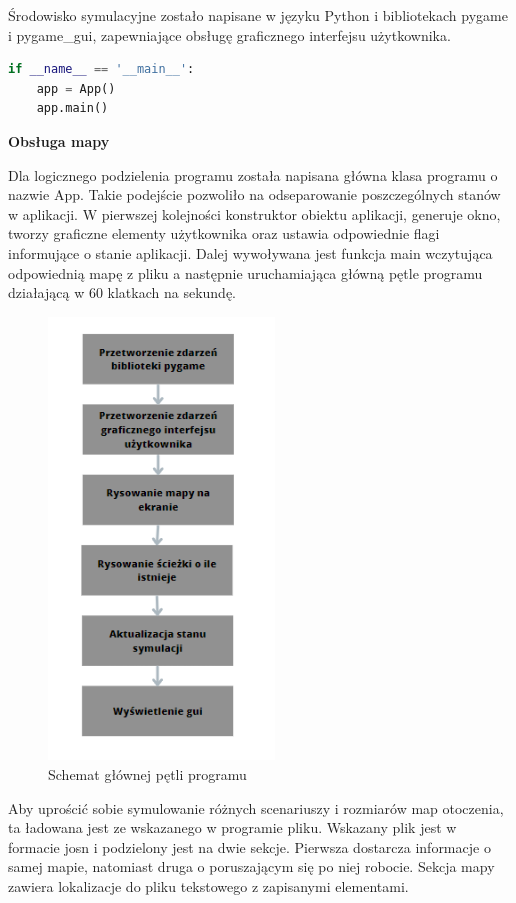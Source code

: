 Środowisko symulacyjne zostało napisane w języku Python i bibliotekach pygame\cite{dokPygame} i pygame\_gui\cite{dokPygameGui},
zapewniające obsługę graficznego interfejsu użytkownika. 
\begin{lstlisting}[language=Python,caption=Uruchomienie aplikacji,label={kodPythonStartApki}]
if __name__ == '__main__':
    app = App()
    app.main()
\end{lstlisting}

\textbf{Obsługa mapy}

Dla logicznego podzielenia programu została napisana główna klasa programu o nazwie App.
Takie podejście pozwoliło na odseparowanie poszczególnych stanów w aplikacji. W pierwszej kolejności konstruktor obiektu aplikacji, generuje okno, tworzy 
graficzne elementy użytkownika oraz ustawia odpowiednie flagi informujące o stanie aplikacji. 
Dalej wywoływana jest funkcja main wczytująca odpowiednią mapę z pliku a następnie uruchamiająca główną pętle programu działającą w 60 klatkach na sekundę.

\begin{figure}[H]
	\centering
	\includegraphics[width=6cm]{pages/implementacja/zdjecia/schematPetliApki.png}
	\caption{Schemat głównej pętli programu}
	\label{fig:schematPetliGlownej}
\end{figure}

Aby uprościć sobie symulowanie różnych scenariuszy i rozmiarów map otoczenia, ta ładowana jest ze wskazanego w 
programie pliku. Wskazany plik jest w formacie josn i podzielony jest na dwie sekcje. 
Pierwsza dostarcza informacje o samej mapie, natomiast druga o poruszającym się po niej robocie. Sekcja mapy zawiera lokalizacje do pliku tekstowego z zapisanymi elementami. 

